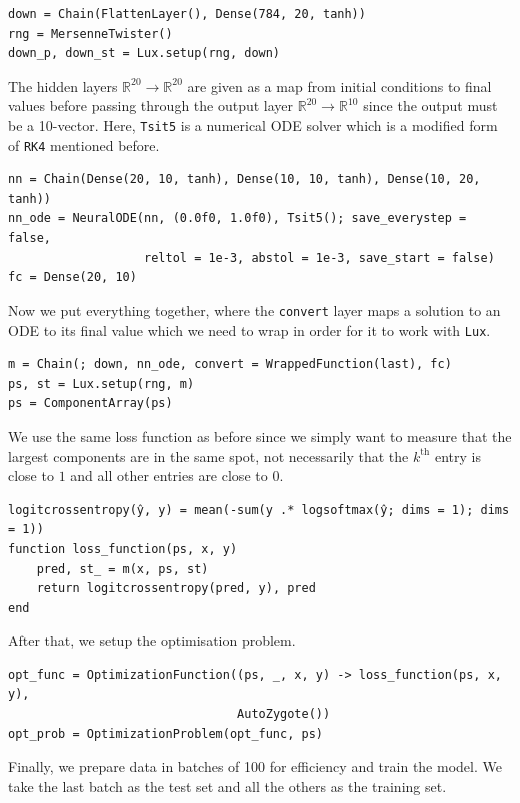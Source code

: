 \documentclass[a4paper,11pt,titlepage]{article}
\theoremstyle{definition}
\theoremstyle{plain}
\theoremstyle{remark}
\begin{document}
\begin{verbatim}
down = Chain(FlattenLayer(), Dense(784, 20, tanh))
rng = MersenneTwister()
down_p, down_st = Lux.setup(rng, down)
\end{verbatim}

The hidden layers $\mathbb{R}^{20}\rightarrow\mathbb{R}^{20}$ are given as a map from initial conditions to final values before passing through the output layer $\mathbb{R}^{20}\rightarrow\mathbb{R}^{10}$ since the output must be a 10-vector. Here, \verb|Tsit5| is a numerical ODE solver which is a modified form of \verb|RK4| mentioned before. \cite{TSITOURAS2011770}

\begin{verbatim}
nn = Chain(Dense(20, 10, tanh), Dense(10, 10, tanh), Dense(10, 20, tanh))
nn_ode = NeuralODE(nn, (0.0f0, 1.0f0), Tsit5(); save_everystep = false,
                   reltol = 1e-3, abstol = 1e-3, save_start = false)
fc = Dense(20, 10)
\end{verbatim}

Now we put everything together, where the \verb|convert| layer maps a solution to an ODE to its final value which we need to wrap in order for it to work with \verb|Lux|.

\begin{verbatim}
m = Chain(; down, nn_ode, convert = WrappedFunction(last), fc)
ps, st = Lux.setup(rng, m)
ps = ComponentArray(ps)
\end{verbatim}

We use the same loss function as before since we simply want to measure that the largest components are in the same spot, not necessarily that the $k^{\mathrm{th}}$ entry is close to $1$ and all other entries are close to $0$.

\begin{verbatim}
logitcrossentropy(ŷ, y) = mean(-sum(y .* logsoftmax(ŷ; dims = 1); dims = 1))
function loss_function(ps, x, y)
    pred, st_ = m(x, ps, st)
    return logitcrossentropy(pred, y), pred
end
\end{verbatim}

After that, we setup the optimisation problem.

\begin{verbatim}
opt_func = OptimizationFunction((ps, _, x, y) -> loss_function(ps, x, y),
                                AutoZygote())
opt_prob = OptimizationProblem(opt_func, ps)
\end{verbatim}

Finally, we prepare data in batches of 100 for efficiency and train the model. We take the last batch as the test set and all the others as the training set.
\end{document}
